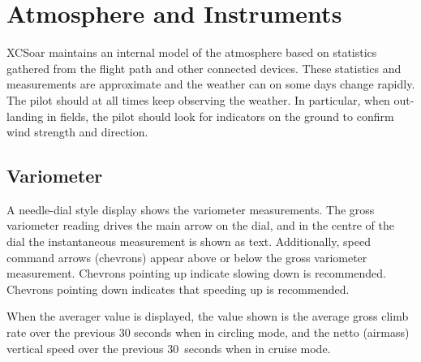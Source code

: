 
\chapter{Atmosphere and Instruments}\label{cha:atmosph}
XCSoar maintains an internal model of the atmosphere based on
statistics gathered from the flight path and other connected devices.
These statistics and measurements
are approximate and the weather can on some days change rapidly.  The
pilot should at all times keep observing the weather.  In
particular, when out-landing in fields, the pilot should look for
indicators on the ground to confirm wind strength and direction.

\section{Variometer}\label{sec:variometer}

A needle-dial style display shows the variometer measurements.  The
gross variometer reading drives the main arrow on the dial, and in the
centre of the dial the instantaneous measurement is shown as text.
Additionally, speed command arrows (chevrons) appear above or below
the gross variometer measurement.  Chevrons pointing up indicate
slowing down is recommended.  Chevrons pointing down indicates that
speeding up is recommended.  

When the averager value is displayed, the value shown is the average
gross climb rate over the previous 30 seconds when in circling mode,
and the netto (airmass) vertical speed over the previous 30~seconds
when in cruise mode.



